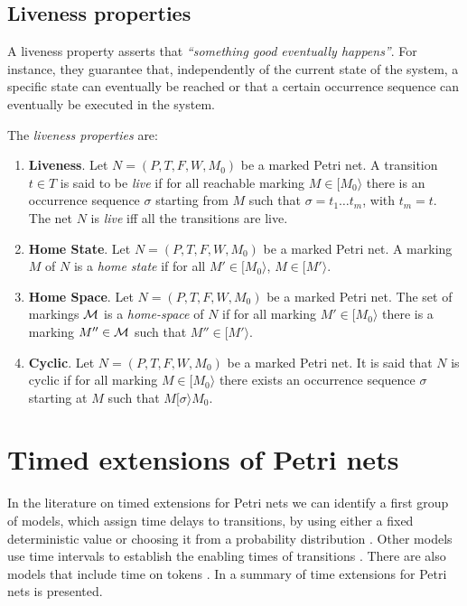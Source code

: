 
\subsection{Liveness properties}
A liveness property asserts that \emph{``something good eventually happens''}.
For instance, they guarantee that, independently of the current state of the system,
a specific state can eventually be reached or that a certain occurrence sequence can eventually
be executed in the system.

The \emph{liveness properties} are:
\begin{enumerate}
\item {\bf Liveness}.
Let $N=(P,T,F,W,M_0)$ be a marked Petri net. A transition $t \in T$
is said to be {\it live} if for all reachable marking $M \in
[ M_0 \rangle$ there is an occurrence sequence $\sigma$ starting from $M$ such that
$\sigma = t_1 \ldots t_m$, with $t_m = t$. The net $N$ is {\it live} iff all the transitions are live.
\item {\bf Home State}.
Let $N=(P,T,F,W,M_0)$ be a marked Petri net. A marking $M$ of $N$ is a {\it home state} if for all
$M' \in [ M_0 \rangle$, $M \in [ M' \rangle$.
\item {\bf Home Space}. Let $N=(P,T,F,W,M_0)$ be a marked Petri net.
The set of markings ${\cal M}$ is a {\it home-space}
of $N$ if for all marking $M' \in [ M_0 \rangle$ there is a marking
$M'' \in {\cal M}$ such that $M'' \in [ M' \rangle$.
\item {\bf Cyclic}.
Let $N=(P,T,F,W,M_0)$ be a marked Petri net. It is said that
$N$ is cyclic if for all marking $M \in [ M_0 \rangle$ there exists an occurrence sequence $\sigma$
starting at $M$ such that $M [ \sigma \rangle M_0$.
\end{enumerate}





\section{Timed extensions of Petri nets}

In the
literature on timed extensions for Petri nets we can identify a
first group of models, which assign time delays to transitions,
by using either a fixed deterministic value
\cite{Ram74,Sif77,VFC93} or choosing it from a probability
distribution \cite{AjCh85}. Other models use time intervals to
establish the enabling times of transitions \cite{Mer74}. 
There are also models that include time on tokens
\cite{van93,van95,BLT90}. In \cite{Bow96,Wan98} 
a summary of time extensions for Petri nets is presented.

